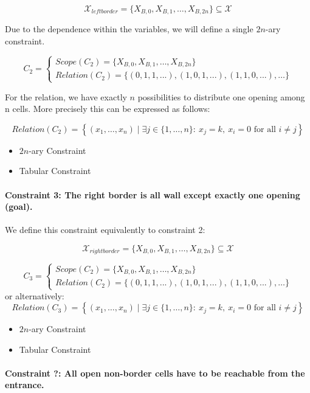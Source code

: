\documentclass[11pt,a4paper]{article}
\begin{document}
\[
\mathcal{X}_{leftborder} = \{X_{B,0}, X_{B,1}, \dots, X_{B,2n}\} \subseteq \mathcal{X}
\]

Due to the dependence within the variables, we will define a single $2n$-ary constraint.

\[
C_2 =
\begin{cases}
Scope(C_2) = \{X_{B,0}, X_{B,1}, \dots, X_{B,2n}\}  \\
Relation(C_2) = \{(0,1,1, ...), (1, 0, 1, ...), (1, 1, 0, ...), \dots\}
\end{cases}
\]

For the relation, we have exactly $n$ possibilities to distribute one opening among n cells. More precisely this can be expressed as follows: 

\[
Relation(C_2) = \left\{(x_1,\ldots,x_n)\mid \exists j\in\{1,\ldots,n\}:\ x_j=k,\ x_i=0\text{ for all }i\ne j\right\}
\]

\begin{itemize}
\item $2n$-ary Constraint
\item Tabular Constraint
\end{itemize}

\paragraph{Constraint 3: The right border is all wall except exactly one opening (goal).}

We define this constraint equivalently to constraint 2: 

\[
\mathcal{X}_{rightborder} = \{X_{B,0}, X_{B,1}, \dots, X_{B,2n}\} \subseteq \mathcal{X}
\]

\[
C_3 =
\begin{cases}
Scope(C_2) = \{X_{B,0}, X_{B,1}, \dots, X_{B,2n}\}  \\
Relation(C_2) = \{(0,1,1, ...), (1, 0, 1, ...), (1, 1, 0, ...), \dots\}
\end{cases}
\]
or alternatively:
\[
Relation(C_3) = \left\{(x_1,\ldots,x_n)\mid \exists j\in\{1,\ldots,n\}:\ x_j=k,\ x_i=0\text{ for all }i\ne j\right\}
\]

\begin{itemize}
\item $2n$-ary Constraint
\item Tabular Constraint
\end{itemize}

\paragraph{Constraint ?: All open non-border cells have to be reachable from the entrance.}
\end{document}

